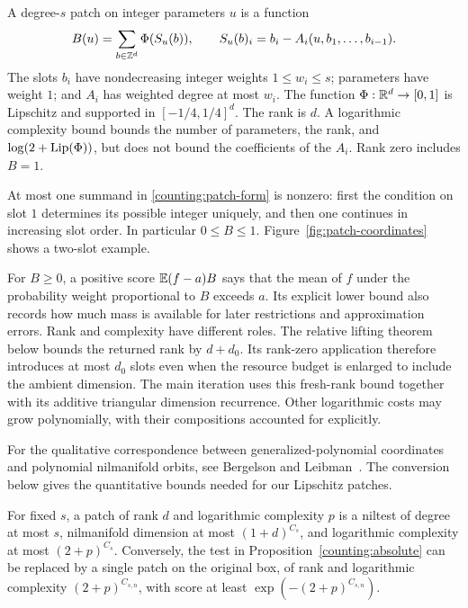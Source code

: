 \begin{definition}[Patch]\label{counting:patch}
A degree-$s$ patch on integer parameters $u$ is a function
\begin{equation}\label{counting:patch-form}
 B(u)=\sum_{b\in\mathbb Z^d}\Phi(S_u(b)),
 \qquad S_u(b)_i=b_i-A_i(u,b_1,\ldots,b_{i-1}).
\end{equation}
The slots $b_i$ have nondecreasing integer weights $1\leq w_i\leq s$;
parameters have weight $1$; and $A_i$ has weighted degree at most $w_i$.
The function $\Phi:\mathbb R^d\to[0,1]$ is Lipschitz and supported in
$[-1/4,1/4]^d$.  The rank is $d$.  A logarithmic complexity bound bounds
the number of parameters, the rank, and $\log(2+\operatorname{Lip}(\Phi))$, but does
not bound the coefficients of the $A_i$.  Rank zero includes $B=1$.
\end{definition}

At most one summand in \eqref{counting:patch-form} is nonzero: first the
condition on slot $1$ determines its possible integer uniquely, and then
one continues in increasing slot order.  In particular $0\leq B\leq1$.
Figure~\ref{fig:patch-coordinates} shows a two-slot example.

For $B\ge0$, a positive score $\mathbb E(f-a)B$ says that the mean of $f$
under the probability weight proportional to $B$ exceeds $a$.
Its explicit lower bound also records how much mass is available for
later restrictions and approximation errors.
Rank and complexity have different roles. The relative lifting theorem
below bounds the returned rank by $d+d_0$. Its rank-zero application
therefore introduces at most $d_0$ slots even when the resource budget
is enlarged to include the ambient dimension. The main iteration uses
this fresh-rank bound together with its additive triangular dimension
recurrence. Other logarithmic costs may grow polynomially, with their
compositions accounted for explicitly.

For the qualitative correspondence between generalized-polynomial
coordinates and polynomial nilmanifold orbits, see Bergelson and
Leibman~\cite[Theorem~A$^*$]{BergelsonLeibman2007}. The conversion below
gives the quantitative bounds needed for our Lipschitz patches.

\begin{lemma}\label{counting:conversion}
For fixed $s$, a patch of rank $d$ and logarithmic complexity $p$ is a
niltest of degree at most $s$, nilmanifold dimension at most
$(1+d)^{C_s}$, and logarithmic complexity at most $(2+p)^{C_s}$.
Conversely, the test in Proposition~\ref{counting:absolute} can be
replaced by a single patch on the original box, of rank and logarithmic
complexity $(2+p)^{C_{s,n}}$, with score at least
$\exp(-(2+p)^{C_{s,n}})$.
\end{lemma}

